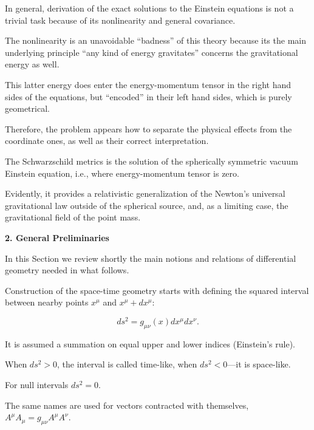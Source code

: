 In general, derivation of the exact solutions to the Einstein equations is not a trivial task because of its nonlinearity and general covariance. 

The nonlinearity is an unavoidable ``badness''  of this theory because its the main underlying principle ``any kind of energy gravitates'' concerns the gravitational energy as well. 

This latter energy does enter the energy-momentum tensor in the right hand sides of the equations, but ``encoded'' in their left hand sides, which is purely geometrical. 

Therefore, the problem appears how to separate the physical effects from the coordinate ones, as well as their correct interpretation. 

The Schwarzschild metrics is the solution of the spherically symmetric vacuum Einstein equation, i.e., where energy-momentum tensor is zero. 

Evidently, it provides a relativistic generalization of the Newton's universal gravitational law outside of the spherical source, and, as a limiting case, the gravitational field of the point mass.



\smallskip



\textbf{2. General Preliminaries}



In this Section we review shortly the main notions and relations of differential geometry needed in what follows.



Construction of the space-time geometry starts with defining the squared interval between nearby points $x^{\mu}$ and $x^{\mu} + dx^{\mu}$:

\begin{equation}

\label{inter}

ds^2 = g_{\mu \nu} (x) dx^{\mu} dx^{\nu} .

\end{equation}

It is assumed a summation on equal upper and lower indices (Einstein's rule). 

When $ds^2 > 0$, the interval is called time-like, when $ds^2 < 0$---it is space-like. 

For null intervals $ds^2 = 0$. 

The same names are used for vectors contracted with themselves, $A^{\mu} A_{\mu} = g_{\mu \nu} A^{\mu} A^{\nu}$. 

